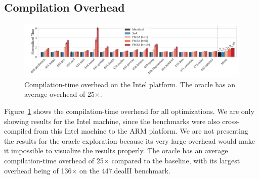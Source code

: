 



\subsection{Compilation Overhead}

\begin{figure}[t]
  \centering
  \includegraphics[width=\linewidth]{figs/compilation-time.pdf}
  \vspace{-4ex}
  \caption{Compilation-time overhead on the Intel platform. The oracle has an average overhead of 25$\times$.}
  \label{fig:compilation-time}
\end{figure}


Figure~\ref{fig:compilation-time} shows the compilation-time overhead for all
optimizations.
We are only showing results for the Intel machine, since the benchmarks were
also cross-compiled from this Intel machine to the ARM platform.
We are not presenting the results for the oracle exploration because its very
large overhead would make it impossible to visualize the results properly.
The oracle has an average compilation-time overhead of 25$\times$ compared to
the baseline, with its largest overhead being of 136$\times$ on the 447.dealII
benchmark.


